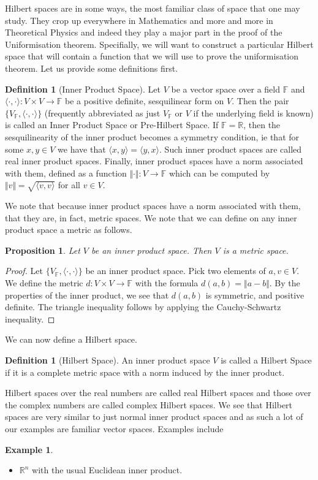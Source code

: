 \documentclass[11pt]{report}
\newtheorem{prop}[thm]{Proposition}
\theoremstyle{definition}
\newtheorem{defn}[thm]{Definition}
\newtheorem{example}[thm]{Example}
\begin{document}
Hilbert spaces are in some ways, the most familiar class of space that one may study. They crop up everywhere in Mathematics and more and more in Theoretical Physics and indeed they play a major part in the proof of the Uniformisation theorem. Specifially, we will want to construct a particular Hilbert space that will contain a function that we will use to prove the uniformisation theorem. Let us provide some definitions first.

\begin{defn}[Inner Product Space]
  Let $V$ be a vector space over a field $\mathbb{F}$ and $\langle \cdot,\cdot \rangle \colon V \times V \rightarrow \mathbb{F}$ be a positive definite, sesquilinear form on $V$. Then the pair $\{V_{\mathbb{F}}, \langle \cdot,\cdot \rangle\}$ (frequently abbreviated as just $V_{\mathbb{F}}$ or $V$ if the underlying field is known) is called an Inner Product Space or Pre-Hilbert Space. If $\mathbb{F}=\mathbb{R}$, then the sesquilinearity of the inner product becomes a symmetry condition, ie that for some $x,y \in V$ we have that $\langle x, y \rangle = \langle y, x \rangle$. Such inner product spaces are called real inner product spaces.
  Finally, inner product spaces have a norm associated with them, defined as a function $\Vert \cdot\Vert  \colon V \rightarrow \mathbb{F}$ which can be computed by $\Vert v\Vert  = \sqrt{\langle v,v \rangle}$ for all $v \in V$. 
\end{defn}

We note that because inner product spaces have a norm associated with them, that they are, in fact, metric spaces. We note that we can define on any inner product space a metric as follows.
\begin{prop}
  Let $V$ be an inner product space. Then $V$ is a metric space.
\end{prop}
\begin{proof}
  Let $\{V_{\mathbb{F}},\langle \cdot,\cdot \rangle\}$ be an inner product space. Pick two elements of $a,v \in V$. We define the metric $d:V\times V \rightarrow \mathbb{F}$ with the formula $d(a,b)=\Vert a-b\Vert $. By the properties of the inner product, we see that $d(a,b)$ is symmetric, and positive definite. The triangle inequality follows by applying the Cauchy-Schwartz inequality. 
\end{proof}
We can now define a Hilbert space.
\begin{defn}[Hilbert Space]
  An inner product space $V$ is called a Hilbert Space if it is a complete metric space with a norm induced by the inner product.
\end{defn}
Hilbert spaces over the real numbers are called real Hilbert spaces and those over the complex numbers are called complex Hilbert spaces. We see that Hilbert spaces are very similar to just normal inner product spaces and as such a lot of our examples are familiar vector spaces. Examples include
\begin{example}
  \begin{itemize}
    \item $\mathbb{R}^n$ with the usual Euclidean inner product.
  \end{itemize}
\end{example}
\end{document}
